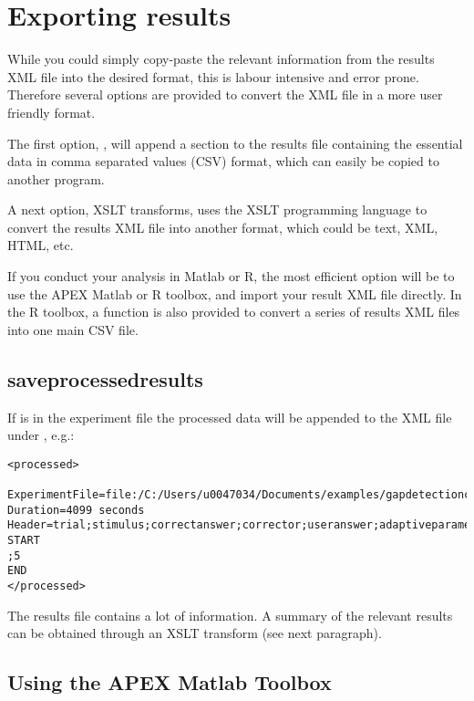 \section{Exporting results}

While you could simply copy-paste the relevant information from the results XML file into the desired format, this is labour intensive and error prone. Therefore several options are provided to convert the XML file in a more user friendly format.

The first option, , will append a section to the results file containing the essential data in comma separated values (CSV) format, which can easily be copied to another program.

A next option, XSLT transforms, uses the XSLT programming language to convert the results XML file into another format, which could be text, XML, HTML, etc.

If you conduct your analysis in Matlab or R, the most efficient option will be to use the APEX Matlab or R toolbox, and import your result XML file directly. In the R toolbox, a function is also provided to convert a series of results XML files into one main CSV file.

\subsection{saveprocessedresults}


If  is  in the experiment
file the processed data will be appended to the XML file under
, e.g.:

\begin{lstlisting}
<processed>

ExperimentFile=file:/C:/Users/u0047034/Documents/examples/gapdetectionchild.apx
Duration=4099 seconds
Header=trial;stimulus;correctanswer;corrector;useranswer;adaptiveparameter
START
;5
END
</processed>
\end{lstlisting}


The results file contains a lot of information. A summary of the
relevant results can be obtained through an XSLT transform (see
next paragraph).



\subsection{Using the APEX Matlab Toolbox}

